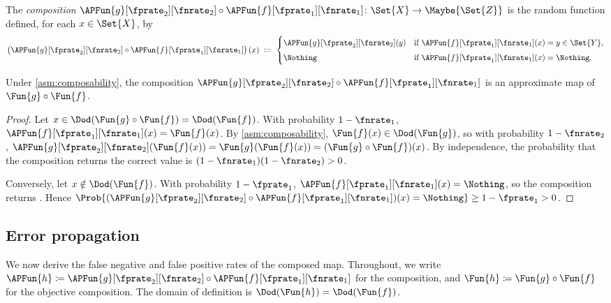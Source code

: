 \documentclass[ ../main.tex]{subfiles}
\begin{document}
\begin{definition}
\label{def:approx-comp}
The \emph{composition}
$\APFun{g}[\fprate_2][\fnrate_2] \circ
 \APFun{f}[\fprate_1][\fnrate_1]
 \colon \Set{X} \to \Maybe{\Set{Z}}$
is the random function defined, for each $x \in \Set{X}$, by
\begin{equation}
\label{eq:comp-def}
\left(\APFun{g}[\fprate_2][\fnrate_2] \circ
      \APFun{f}[\fprate_1][\fnrate_1]\right)(x)
\;\coloneqq\;
\begin{cases}
\APFun{g}[\fprate_2][\fnrate_2](y)
  & \text{if } \APFun{f}[\fprate_1][\fnrate_1](x) = y \in \Set{Y},\\[4pt]
\Nothing
  & \text{if } \APFun{f}[\fprate_1][\fnrate_1](x) = \Nothing.
\end{cases}
\end{equation}
\end{definition}

\begin{lemma}
\label{prop:closure}
Under \cref{asm:composability}, the composition
$\APFun{g}[\fprate_2][\fnrate_2] \circ
 \APFun{f}[\fprate_1][\fnrate_1]$
is an approximate map of $\Fun{g} \circ \Fun{f}$.
\end{lemma}
\begin{proof}
Let $x \in \Dod(\Fun{g} \circ \Fun{f}) = \Dod(\Fun{f})$.
With probability $1 - \fnrate_1$,
$\APFun{f}[\fprate_1][\fnrate_1](x) = \Fun{f}(x)$.
By \cref{asm:composability},
$\Fun{f}(x) \in \Dod(\Fun{g})$, so with probability
$1 - \fnrate_2$,
$\APFun{g}[\fprate_2][\fnrate_2](\Fun{f}(x)) = \Fun{g}(\Fun{f}(x))
= (\Fun{g} \circ \Fun{f})(x)$.
By independence, the probability that the composition returns the
correct value is $(1 - \fnrate_1)(1 - \fnrate_2) > 0$.

Conversely, let $x \notin \Dod(\Fun{f})$.
With probability $1 - \fprate_1$,
$\APFun{f}[\fprate_1][\fnrate_1](x) = \Nothing$, so the composition
returns \Nothing.
Hence $\Prob{(\APFun{g}[\fprate_2][\fnrate_2] \circ
\APFun{f}[\fprate_1][\fnrate_1])(x) = \Nothing}
\geq 1 - \fprate_1 > 0$.
\end{proof}

\subsection{Error propagation}
\label{sec:error-prop}

We now derive the false negative and false positive rates of the
composed map.  Throughout, we write
$\APFun{h} \coloneqq
\APFun{g}[\fprate_2][\fnrate_2] \circ
\APFun{f}[\fprate_1][\fnrate_1]$
for the composition, and
$\Fun{h} \coloneqq \Fun{g} \circ \Fun{f}$ for the objective
composition.  The domain of definition is
$\Dod(\Fun{h}) = \Dod(\Fun{f})$.
\end{document}
